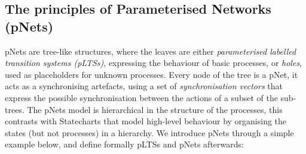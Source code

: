 \documentclass{elsarticle}
\begin{document}
\subsection{The principles of Parameterised Networks (pNets)}
\label{section:pnets-princ}

pNets are tree-like structures, where the leaves are either \emph{parameterised labelled transition systems (pLTSs)}, expressing the
behaviour of basic processes, or \emph{holes}, used as placeholders
for unknown processes. 
Every node of the tree  is a pNet, it acts as a  synchronising artefacts, using a
set of \emph{synchronisation vectors} that express the possible
synchronisation between the  actions of a subset of the sub-trees.
The pNets model is hierarchical in the structure of the processes, this contrasts with Statecharts  \cite{Harel:87} that model high-level behaviour by organising the states (but not processes) in a hierarchy. 
We introduce  pNets through a simple example below, and define formally pLTSs and pNets afterwards:
\end{document}
